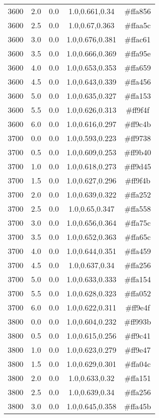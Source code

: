 \begin{tabular}{ccccc}
3600 & 2.0 & 0.0 & 1.0,0.661,0.34 & \#ffa856 \\ 
3600 & 2.5 & 0.0 & 1.0,0.67,0.363 & \#ffaa5c \\ 
3600 & 3.0 & 0.0 & 1.0,0.676,0.381 & \#ffac61 \\ 
3600 & 3.5 & 0.0 & 1.0,0.666,0.369 & \#ffa95e \\ 
3600 & 4.0 & 0.0 & 1.0,0.653,0.353 & \#ffa659 \\ 
3600 & 4.5 & 0.0 & 1.0,0.643,0.339 & \#ffa456 \\ 
3600 & 5.0 & 0.0 & 1.0,0.635,0.327 & \#ffa153 \\ 
3600 & 5.5 & 0.0 & 1.0,0.626,0.313 & \#ff9f4f \\ 
3600 & 6.0 & 0.0 & 1.0,0.616,0.297 & \#ff9c4b \\ 
3700 & 0.0 & 0.0 & 1.0,0.593,0.223 & \#ff9738 \\ 
3700 & 0.5 & 0.0 & 1.0,0.609,0.253 & \#ff9b40 \\ 
3700 & 1.0 & 0.0 & 1.0,0.618,0.273 & \#ff9d45 \\ 
3700 & 1.5 & 0.0 & 1.0,0.627,0.296 & \#ff9f4b \\ 
3700 & 2.0 & 0.0 & 1.0,0.639,0.322 & \#ffa252 \\ 
3700 & 2.5 & 0.0 & 1.0,0.65,0.347 & \#ffa558 \\ 
3700 & 3.0 & 0.0 & 1.0,0.656,0.364 & \#ffa75c \\ 
3700 & 3.5 & 0.0 & 1.0,0.652,0.363 & \#ffa65c \\ 
3700 & 4.0 & 0.0 & 1.0,0.644,0.351 & \#ffa459 \\ 
3700 & 4.5 & 0.0 & 1.0,0.637,0.34 & \#ffa256 \\ 
3700 & 5.0 & 0.0 & 1.0,0.633,0.333 & \#ffa154 \\ 
3700 & 5.5 & 0.0 & 1.0,0.628,0.323 & \#ffa052 \\ 
3700 & 6.0 & 0.0 & 1.0,0.622,0.311 & \#ff9e4f \\ 
3800 & 0.0 & 0.0 & 1.0,0.604,0.232 & \#ff993b \\ 
3800 & 0.5 & 0.0 & 1.0,0.615,0.256 & \#ff9c41 \\ 
3800 & 1.0 & 0.0 & 1.0,0.623,0.279 & \#ff9e47 \\ 
3800 & 1.5 & 0.0 & 1.0,0.629,0.301 & \#ffa04c \\ 
3800 & 2.0 & 0.0 & 1.0,0.633,0.32 & \#ffa151 \\ 
3800 & 2.5 & 0.0 & 1.0,0.639,0.34 & \#ffa256 \\ 
3800 & 3.0 & 0.0 & 1.0,0.645,0.358 & \#ffa45b \\ 

\end{tabular}
